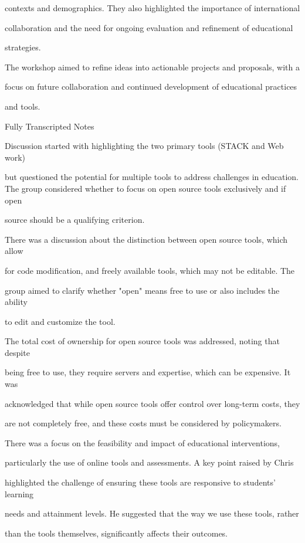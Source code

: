\documentclass[11pt]{article}
\begin{document}
contexts and demographics. They also highlighted the importance of international

collaboration and the need for ongoing evaluation and refinement of educational

strategies.

The workshop aimed to refine ideas into actionable projects and proposals, with a

focus on future collaboration and continued development of educational practices

and tools.

Fully Transcripted Notes

Discussion started with highlighting the two primary tools (STACK and Web work)

but questioned the potential for multiple tools to address challenges in education. The group considered whether to focus on open source tools exclusively and if open

source should be a qualifying criterion.

There was a discussion about the distinction between open source tools, which allow

for code modification, and freely available tools, which may not be editable. The

group aimed to clarify whether "open" means free to use or also includes the ability

to edit and customize the tool.

The total cost of ownership for open source tools was addressed, noting that despite

being free to use, they require servers and expertise, which can be expensive. It was

acknowledged that while open source tools offer control over long-term costs, they

are not completely free, and these costs must be considered by policymakers.

There was a focus on the feasibility and impact of educational interventions,

particularly the use of online tools and assessments. A key point raised by Chris

highlighted the challenge of ensuring these tools are responsive to students' learning

needs and attainment levels. He suggested that the way we use these tools, rather

than the tools themselves, significantly affects their outcomes.
\end{document}
